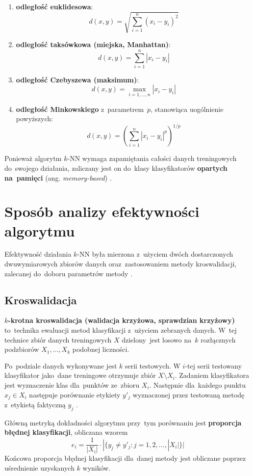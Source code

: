 \documentclass[11pt,a4paper]{article}
\begin{document}
\begin{enumerate}
    \item \textbf{odległość euklidesowa}:
    $$ d(x,y) = \sqrt{\sum_{i=1}^n (x_i - y_i)^2} $$
    \item \textbf{odległość taksówkowa (miejska, Manhattan)}:
    $$ d(x,y) = \sum_{i=1}^n |x_i - y_i| $$
    \item \textbf{odległość Czebyszewa (maksimum)}:
    $$ d(x,y) = \max_{i=1,\dots,n} |x_i - y_i| $$
    \item \textbf{odległość Minkowskiego} z~parametrem~$p$, stanowiąca uogólnienie powyższych:
    $$ d(x,y) = \left( \sum_{i=1}^n |x_i - y_i|^p \right)^{1/p} $$
\end{enumerate}

Ponieważ algorytm $k$-NN wymaga zapamiętania całości danych treningowych do~swojego działania, zaliczany jest on do~klasy klasyfikatorów \textbf{opartych na~pamięci} (ang. \emph{memory-based}) \cite[s.~463]{hastie2009}.

\section{Sposób analizy efektywności algorytmu}

Efektywność działania $k$-NN była mierzona z~użyciem dwóch dostarczonych dwuwymiarowych zbiorów danych oraz~zastosowaniem metody kroswalidacji, zalecanej do~doboru parametrów metody \cite[s.~470]{hastie2009}.

\subsection{Kroswalidacja}

\textbf{$k$-krotna kroswalidacja (walidacja krzyżowa, sprawdzian krzyżowy)} to~technika ewaluacji metod klasyfikacji z~użyciem zebranych danych.
W~tej technice zbiór danych treningowych $X$ dzielony~jest losowo na~$k$ rozłącznych podzbiorów $X_1,\dots,X_k$ podobnej liczności.

Po~podziale danych wykonywane jest $k$ serii testowych.
W $i$-tej serii testowany klasyfikator jako~dane treningowe otrzymuje zbiór $X \setminus X_i$.
Zadaniem klasyfikatora jest wyznaczenie klas dla~punktów ze~zbioru $X_i$.
Następnie dla~każdego punktu $x_j \in X_i$ następuje porównanie etykiety $y'_j$ wyznaczonej przez testowaną metodę z~etykietą faktyczną $y_j$ \cite[s.~241--243]{hastie2009}.

Główną metryką dokładności algorytmu przy~tym porównaniu jest \textbf{proporcja błędnej klasyfikacji}, obliczana wzorem
$$ e_i = \frac{1}{|X_i|} \cdot | \{ y_j \neq y'_j : j = 1,2,\dots,|X_i| \} | $$
Końcowa proporcja błędnej klasyfikacji dla~danej metody jest obliczane poprzez uśrednienie uzyskanych $k$ wyników.
\end{document}
